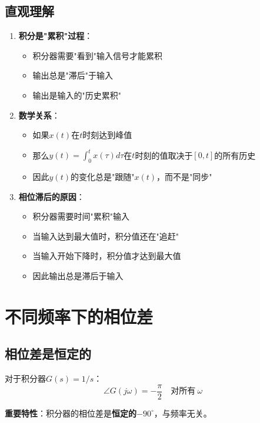 \documentclass[12pt,a4paper]{article}
\begin{document}
\subsection{直观理解}

\begin{enumerate}
\item \textbf{积分是"累积"过程}：
\begin{itemize}
\item 积分器需要"看到"输入信号才能累积
\item 输出总是"滞后"于输入
\item 输出是输入的"历史累积"
\end{itemize}

\item \textbf{数学关系}：
\begin{itemize}
\item 如果$x(t)$在$t$时刻达到峰值
\item 那么$y(t) = \int_0^t x(\tau)d\tau$在$t$时刻的值取决于$[0,t]$的所有历史
\item 因此$y(t)$的变化总是"跟随"$x(t)$，而不是"同步"
\end{itemize}

\item \textbf{相位滞后的原因}：
\begin{itemize}
\item 积分器需要时间"累积"输入
\item 当输入达到最大值时，积分值还在"追赶"
\item 当输入开始下降时，积分值才达到最大值
\item 因此输出总是滞后于输入
\end{itemize}
\end{enumerate}

\section{不同频率下的相位差}

\subsection{相位差是恒定的}

对于积分器$G(s) = 1/s$：
\begin{equation}
\angle G(j\omega) = -\frac{\pi}{2} \quad \text{对所有}\ \omega
\end{equation}

\textbf{重要特性}：积分器的相位差是\textbf{恒定的}$-90^\circ$，与频率无关。
\end{document}
